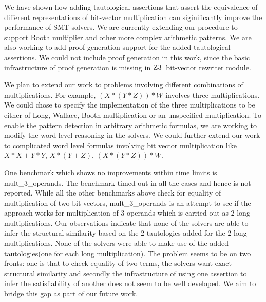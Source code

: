 We have shown how adding tautological assertions that assert the
equivalence of different representations of bit-vector multiplication
can siginificantly improve the performance of SMT solvers.  We are
currently extending our procedure to support Booth multiplier and
other more complex arithmetic patterns.  We are also working to add
proof generation support for the added tautological assertions.  We
could not include proof generation in this work, since the basic
infrastructure of proof generation is missing in $\textsc{Z3}$~bit-vector
rewriter module.
%

We plan to extend our work to problems involving different
combinations of multiplications. For example, $(X*(Y*Z))*W$ involves
three multiplications. We could chose to specify the implementation of
the three multiplications to be either of Long, Wallace, Booth
multiplication or an unspecified multiplication. To enable the pattern
detection in arbitrary arithmetic formulas, we are working to modify
the word level reasoning in the solvers.
We could further extend our work to complicated word level formulas involving bit vector multiplication like $X*X + Y*Y$, $X*(Y+Z)$, $(X*(Y*Z))*W$.

One benchmark which shows no improvements within time limits is mult\_3\_operands. The benchmark timed out in all the cases and hence is not reported. While all the other benchmarks above check for equality of multiplication of two bit vectors, mult\_3\_operands is an attempt to see if the approach works for multiplication of 3 operands which is carried out as 2 long multiplications. Our observations indicate that none of the solvers are able to infer the structural similarity based on the 2 tautologies added for the 2 long multiplications.
None of the solvers were able to make use of the added tautologies(one for each long multiplication). 
The problem seems to be on two fronts: one is that to check equality of two terms, the solvers want exact structural similarity and secondly the infrastructure of using one assertion to infer the satisfiability of another does not seem to be well developed. 
We aim to bridge this gap as part of our future work.




